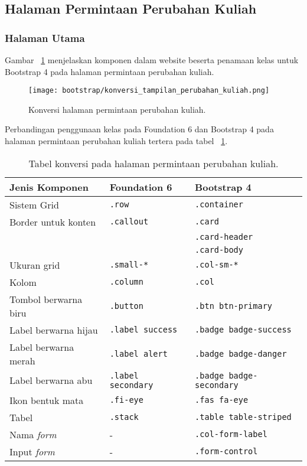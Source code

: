 \subsection{Halaman Permintaan Perubahan Kuliah}
\subsubsection{Halaman Utama}
\noindent Gambar ~\ref{fig:konversiPermintaanPerubahanKuliah} menjelaskan komponen dalam website beserta penamaan kelas untuk Bootstrap 4 pada halaman permintaan perubahan kuliah.\\
\begin{figure} [H]
	\centering  
	\texttt{[image: bootstrap/konversi\_tampilan\_perubahan\_kuliah.png]}
	\caption{Konversi halaman permintaan perubahan kuliah.}
	\label{fig:konversiPermintaanPerubahanKuliah}
\end{figure}

\noindent Perbandingan penggunaan kelas pada Foundation 6 dan Bootstrap 4 pada halaman permintaan perubahan kuliah tertera pada tabel ~\ref{table:konversiPermintaanPerubahanKuliah}.\\
\begin{table}[H]
	\caption{Tabel konversi pada halaman permintaan perubahan kuliah.}
	\begin{tabular}{| p{} | p{} | p{} |} 
		\hline
		\textbf{Jenis Komponen} & \textbf{Foundation 6} & \textbf{Bootstrap 4}  \\ [0.5ex] 
		\hline	
		Sistem Grid & \texttt{.row} &   \texttt{.container} \\ 
		\hline	
		Border untuk konten & \texttt{.callout} &  \texttt{.card}  \\
		&& \texttt{.card-header}\\
		&& \texttt{.card-body}\\
		\hline	
		Ukuran grid & \texttt{.small-*} &  \texttt{.col-sm-*} \\
		\hline
		Kolom & \texttt{.column} &  \texttt{.col} \\	
		\hline	
		Tombol berwarna biru & \texttt{.button} &  \texttt{.btn btn-primary}\\
		\hline	
		Label berwarna hijau & \texttt{.label success } & \texttt{.badge badge-success} \\
		\hline	
		Label berwarna merah & \texttt{.label alert} & \texttt{.badge badge-danger}  \\
		\hline	
		Label berwarna abu & \texttt{.label secondary} & \texttt{.badge badge-secondary}  \\
		\hline	
		Ikon bentuk mata & \texttt{.fi-eye} &  \texttt{.fas fa-eye} \\	
		\hline	
		Tabel & \texttt{.stack} & \texttt{.table table-striped}  \\
		\hline	
		Nama \textit{form} & - & \texttt{.col-form-label}  \\ 
		\hline	
		Input \textit{form} & - & \texttt{.form-control}  \\ [1ex] 
		\hline
	\end{tabular}
	\label{table:konversiPermintaanPerubahanKuliah}
\end{table}

